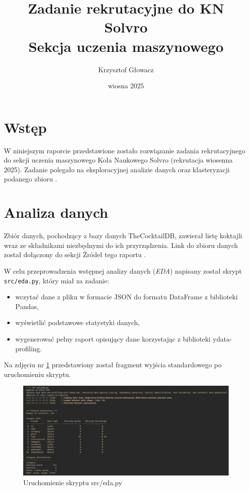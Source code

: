\documentclass{article}
\title{%
    Zadanie rekrutacyjne do KN Solvro\\
    \large{Sekcja uczenia maszynowego}
}
\author{Krzysztof Głowacz}
\date{wiosna 2025}
\newcommand{\code}[1]{\colorbox{light-gray}{\texttt{#1}}}
\begin{document}
\maketitle
\tableofcontents
\clearpage

\section{Wstęp}
    W niniejszym raporcie przedstawione zostało rozwiązanie zadania rekrutacyjnego do sekcji uczenia maszynowego Koła Naukowego Solvro (rekrutacja wiosenna 2025). Zadanie polegało na eksploracyjnej analizie danych oraz klasteryzacji podanego zbioru \cite{instrukcja}.

\section{Analiza danych}
    Zbiór danych, pochodzący z bazy danych TheCocktailDB, zawierał listę koktajli wraz ze składnikami niezbędnymi do ich przyrządzenia. Link do zbioru danych został dołączony do sekcji Źródeł tego raportu \cite{zbior_danych}.

    W celu przeprowadzenia wstępnej analizy danych (\textit{EDA}) napisany został skrypt \code{src/eda.py}, który miał za zadanie:
    \begin{itemize}
        \item wczytać dane z pliku w formacie JSON do formatu DataFrame z biblioteki Pandas,
        \item wyświetlić podstawowe statystyki danych,
        \item wygenerować pełny raport opisujący dane korzystając z biblioteki ydata-profiling.
    \end{itemize}
    Na zdjęciu nr \ref{fig:run_eda} przedstawiony został fragment wyjścia standardowego po uruchomieniu skryptu.

    \begin{figure}[!htbp]%
        \centering
        \includegraphics[width=\textwidth]{eda_run.png}
        \caption{Uruchomienie skryptu src/eda.py}%
        \label{fig:run_eda}
    \end{figure}
\end{document}
